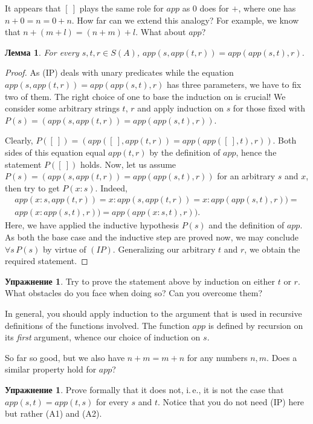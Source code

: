\documentclass[12pt,notitlepage]{article}
\theoremstyle{plain}
\newtheorem{lemma}[thm]{Лемма}
\theoremstyle{definition}
\newtheorem{exc}[thm]{Упражнение}
\theoremstyle{plain}
\newcommand{\1}{\mathbf{1}}
\newcommand{\0}{\mathbf{0}}
\begin{document}
It appears that $[\ ]$ plays the same role for $app$ as $0$ does for ${+}$, where one has $n + 0 = n = 0 + n$. How far can we extend this analogy? For example, we know that $n + (m + l) = (n + m) + l$. What about $app$?

\begin{lemma}\label{cs:app_assoc}
	For every $s, t, r \in S(A)$, $app (s, app(t, r)) = app (app (s, t), r)$.
\end{lemma}
\begin{proof}
	As (IP) deals with unary predicates while the equation $app (s, app(t, r)) = app (app (s, t), r)$ has three parameters, we have to fix two of them. The right choice of one to base the induction on is crucial! We consider some arbitrary strings $t$, $r$ and apply induction on $s$ for those fixed with $P(s) = (app (s, app(t, r)) = app (app (s, t), r))$. 
	
	Clearly, $P([\ ]) = (app ([\ ], app(t, r)) = app (app ([\ ], t), r))$. Both sides of this equation equal $app(t,r)$ by the definition of $app$, hence the statement $P([\ ])$ holds. Now, let us assume $P(s) = (app (s, app(t, r)) = app (app (s, t), r))$ for an arbitrary $s$ and $x$, then try to get $P(x:s)$. Indeed,
	\begin{multline*}
		app (x:s, app(t, r)) = x : app (s, app(t, r)) = x : app (app (s, t), r)) =\\
		app (x : app (s, t), r)) = app (app (x : s, t), r)).
	\end{multline*}
	Here, we have applied the inductive hypothesis $P(s)$ and the definition of $app$. As both the base case and the inductive step are proved now, we may conclude $\forall s\, P(s)$ by virtue of $(IP)$. Generalizing our arbitrary $t$ and $r$, we obtain the required statement.
\end{proof}
\begin{exc}
	Try to prove the statement above by induction on either $t$ or $r$. What obstacles do you face when doing so? Can you overcome them?
\end{exc}

In general, you should apply induction to the argument that is used in recursive definitions of the functions involved. The function $app$ is defined by recursion on its \emph{first} argument, whence our choice of induction on $s$.

\medskip
So far so good, but we also have $n + m = m + n$ for any numbers $n, m$. Does a similar property hold for $app$?
\begin{exc}
	Prove formally that it does not, i.\,e., it is not the case that $app(s,t) = app(t,s)$ for every $s$ and $t$. Notice that you do not need (IP) here but rather (A1) and (A2).
\end{exc}
\end{document}
